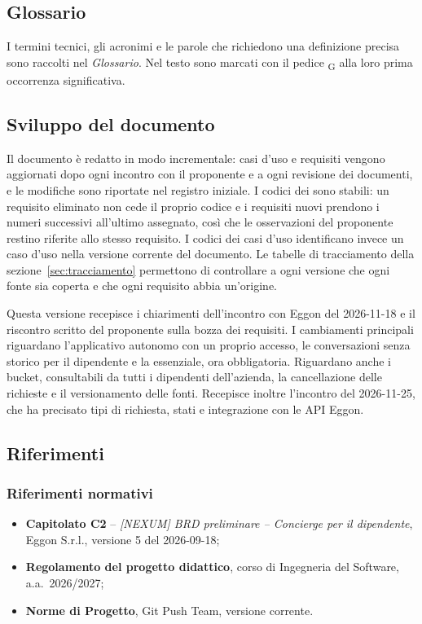 \documentclass[documento]{gpt}
\begin{document}
\subsection{Glossario}
I termini tecnici, gli acronimi e le parole che richiedono una definizione
precisa sono raccolti nel \textit{Glossario}. Nel testo sono marcati con il
pedice \textsubscript{G} alla loro prima occorrenza significativa.

\subsection{Sviluppo del documento}
Il documento è redatto in modo incrementale: casi d'uso e requisiti vengono
aggiornati dopo ogni incontro con il proponente e a ogni revisione dei
documenti, e le modifiche sono riportate nel registro iniziale. I codici dei
 sono stabili: un requisito eliminato non cede il
proprio codice e i requisiti nuovi prendono i numeri successivi all'ultimo
assegnato, così che le osservazioni del proponente restino riferite allo stesso
requisito. I codici dei casi d'uso identificano invece un caso d'uso nella
versione corrente del documento. Le tabelle di tracciamento della
sezione~\ref{sec:tracciamento} permettono di controllare a ogni versione che ogni
fonte sia coperta e che ogni requisito abbia un'origine.

Questa versione recepisce i chiarimenti dell'incontro con Eggon del 2026-11-18
e il riscontro scritto del proponente sulla bozza dei requisiti. I cambiamenti
principali riguardano l'applicativo autonomo con un proprio accesso, le
conversazioni senza storico per il dipendente e la  essenziale,
ora obbligatoria. Riguardano anche i bucket, consultabili da tutti i dipendenti
dell'azienda, la cancellazione delle richieste e il versionamento delle fonti.
Recepisce inoltre l'incontro del 2026-11-25, che ha precisato tipi di
richiesta, stati e integrazione con le API Eggon.

\subsection{Riferimenti}

\subsubsection{Riferimenti normativi}
\begin{itemize}
  \item \textbf{Capitolato C2} -- \textit{[NEXUM] BRD preliminare -- Concierge
        per il dipendente}, Eggon S.r.l., versione 5 del 2026-09-18;
  \item \textbf{Regolamento del progetto didattico}, corso di Ingegneria del
        Software, a.a.~2026/2027;
  \item \textbf{Norme di Progetto}, Git Push Team, versione corrente.
\end{itemize}
\end{document}
